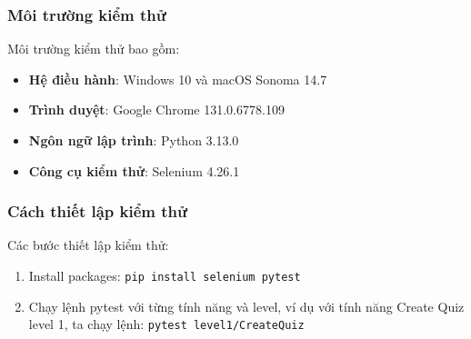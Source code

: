 \subsubsection{Môi trường kiểm thử}
Môi trường kiểm thử bao gồm:
\begin{itemize}
    \item \textbf{Hệ điều hành}: Windows 10 và macOS Sonoma 14.7
    \item \textbf{Trình duyệt}: Google Chrome 131.0.6778.109
    \item \textbf{Ngôn ngữ lập trình}: Python 3.13.0
    \item \textbf{Công cụ kiểm thử}: Selenium 4.26.1
\end{itemize}

\subsubsection{Cách thiết lập kiểm thử}

Các bước thiết lập kiểm thử:
\begin{enumerate}
    \item Install packages: \texttt{pip install selenium pytest}
    \item Chạy lệnh pytest với từng tính năng và level, ví dụ với tính năng Create Quiz level 1, ta chạy lệnh: \texttt{pytest level1/CreateQuiz}
\end{enumerate}